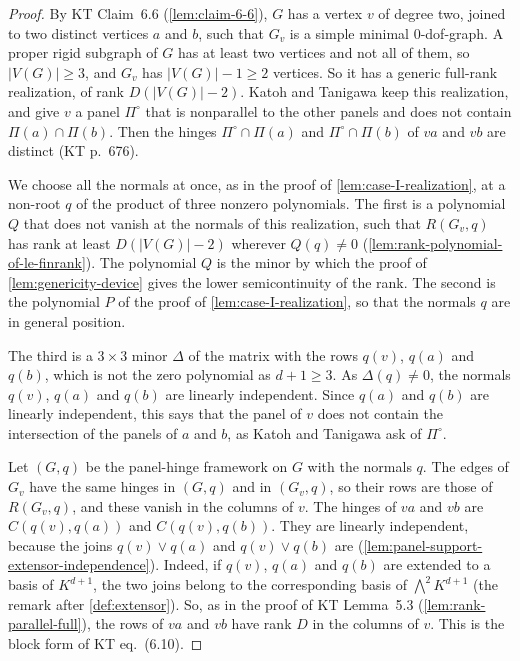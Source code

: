 \begin{proof}
  \leanok
  By KT Claim~6.6 (\cref{lem:claim-6-6}), $G$ has a vertex $v$ of degree
  two, joined to two distinct vertices $a$ and $b$, such that $G_v$ is a
  simple minimal $0$-dof-graph. A proper rigid subgraph of $G$ has at
  least two vertices and not all of them, so $|V(G)| \ge 3$, and $G_v$
  has $|V(G)| - 1 \ge 2$ vertices. So it has a generic full-rank
  realization, of rank $D(|V(G)| - 2)$. Katoh and Tanigawa keep this
  realization, and give $v$ a panel $\Pi^\circ$ that is nonparallel to
  the other panels
  and does not contain $\Pi(a) \cap \Pi(b)$. Then the hinges
  $\Pi^\circ \cap \Pi(a)$ and $\Pi^\circ \cap \Pi(b)$ of $va$ and $vb$
  are distinct (KT p.~676).

  We choose all the normals at once, as in the proof of
  \cref{lem:case-I-realization}, at a non-root $q$ of the product of
  three nonzero polynomials. The first is a polynomial $Q$ that does not
  vanish at the normals of this realization, such that $R(G_v, q)$ has
  rank at least $D(|V(G)| - 2)$ wherever $Q(q) \neq 0$
  (\cref{lem:rank-polynomial-of-le-finrank}). The polynomial $Q$ is the
  minor by which the proof of \cref{lem:genericity-device} gives the
  lower semicontinuity of the rank.
  The second is the polynomial $P$ of the proof of
  \cref{lem:case-I-realization}, so that the normals $q$ are in general
  position.

  The third is a $3 \times 3$ minor $\Delta$ of the matrix with the rows
  $q(v)$, $q(a)$ and $q(b)$, which is not the zero polynomial as
  $d + 1 \ge 3$. As $\Delta(q) \neq 0$, the normals $q(v)$, $q(a)$ and
  $q(b)$ are linearly independent. Since $q(a)$ and $q(b)$ are linearly
  independent, this says that the panel of $v$ does not contain the
  intersection of the panels of $a$ and $b$, as Katoh and Tanigawa ask
  of $\Pi^\circ$.

  Let $(G, q)$ be the panel-hinge framework on $G$ with the normals $q$.
  The edges of $G_v$ have the same hinges in $(G, q)$ and in $(G_v, q)$,
  so their rows are those of $R(G_v, q)$, and these vanish in the columns
  of $v$. The hinges of $va$ and $vb$ are $C(q(v), q(a))$ and
  $C(q(v), q(b))$. They are linearly independent, because the joins
  $q(v) \vee q(a)$ and $q(v) \vee q(b)$ are
  (\cref{lem:panel-support-extensor-independence}). Indeed, if $q(v)$,
  $q(a)$ and $q(b)$ are extended to a basis of $K^{d+1}$, the two joins
  belong to the corresponding basis of $\bigwedge^2 K^{d+1}$ (the remark
  after \cref{def:extensor}). So, as in the proof of KT Lemma~5.3
  (\cref{lem:rank-parallel-full}), the rows of $va$ and $vb$ have rank
  $D$ in the columns of $v$. This is the block form of KT eq.~(6.10).


\end{proof}

